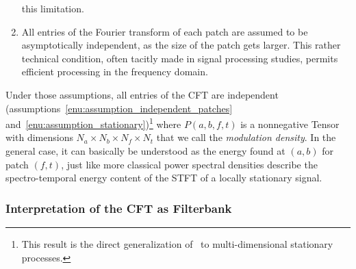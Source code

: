 \begin{enumerate}[leftmargin=0cm,itemindent=.5cm,labelwidth=\itemindent,labelsep=0cm,align=left]
this limitation.\label{enu:assumption_stationary}
\item All entries of the Fourier transform of each patch
are assumed to be asymptotically independent, as the size of the patch
gets larger. This rather technical condition, often tacitly made in
signal processing studies, permits efficient processing in the frequency
domain.\label{enu:assumption_harmonisable}
\end{enumerate}

Under those assumptions, all entries of the CFT are independent
(assumptions~\ref{enu:assumption_independent_patches} and~\ref{enu:assumption_stationary})\footnote{This result is the direct generalization
of~\cite[th. 6.5.1]{samoradnitsky94} to multi-dimensional stationary processes.}
where $P\left(a,b,f,t\right)$ is a nonnegative Tensor with dimensions $N_{a}\times N_{b}\times N_{f}\times N_{t}$
 that we call the \emph{modulation density}. In
the general case, it can basically be understood as the energy found at $\left(a,b\right)$ for patch
$\left(f,t\right)$, just like more classical power spectral
densities describe the spectro-temporal energy content of the STFT
of a locally stationary signal.

\subsubsection{Interpretation of the CFT as Filterbank}
\label{sub:interpretation}

